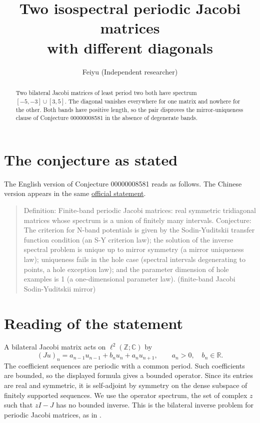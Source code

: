 \documentclass[11pt]{article}
\title{Two isospectral periodic Jacobi matrices\texorpdfstring{\\}{ }%
with different diagonals}
\author{Feiyu (Independent researcher)}
\date{}
\begin{document}
\maketitle

\begin{abstract}
Two bilateral Jacobi matrices of least period two both have spectrum
$[-5,-3]\cup[3,5]$. The diagonal vanishes everywhere for one matrix and
nowhere for the other. Both bands have positive length, so the pair
disproves the mirror-uniqueness clause of Conjecture 00000008581 in the
absence of degenerate bands.
\end{abstract}

\section{The conjecture as stated}

The English version of Conjecture 00000008581 reads as follows. The
Chinese version appears in the same \href{https://github.com/The-Last-Math-Competition/The-Last-Math-Competition/blob/8c9cc2fb29ed8a59d7daa18ed6ba387a77cf897f/conjectures/00000008581.md}{official statement}.

\begin{quote}
Definition: Finite-band periodic Jacobi matrices: real symmetric
tridiagonal matrices whose spectrum is a union of finitely many
intervals. Conjecture: The criterion for N-band potentials is given by
the Sodin-Yuditskii transfer function condition (an S-Y criterion law);
the solution of the inverse spectral problem is unique up to mirror
symmetry (a mirror uniqueness law); uniqueness fails in the hole case
(spectral intervals degenerating to points, a hole exception law); and
the parameter dimension of hole examples is 1 (a one-dimensional
parameter law). (finite-band Jacobi Sodin-Yuditskii mirror)
\end{quote}

\section{Reading of the statement}

A bilateral Jacobi matrix acts on $\ell^2(\mathbb Z;\mathbb C)$ by
\[
 (Ju)_n = a_{n-1}u_{n-1}+b_nu_n+a_nu_{n+1},
 \qquad a_n>0,\quad b_n\in\mathbb R.
\]
The coefficient sequences are periodic with a common period. Such
coefficients are bounded, so the displayed formula gives a bounded
operator. Since its entries are real and symmetric, it is self-adjoint
by symmetry on the dense subspace of finitely supported sequences.
We use the operator spectrum, the set of complex $z$ such that
$zI-J$ has no bounded inverse. This is the bilateral inverse problem
for periodic Jacobi matrices, as in \cite[\S 1 and \S 2.14]{dks}.
\end{document}
